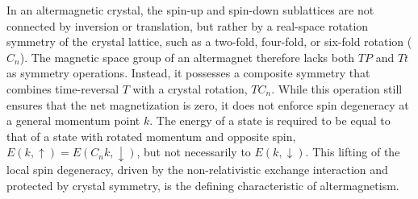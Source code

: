 \documentclass{article}
\begin{document}
In an altermagnetic crystal, the spin-up and spin-down sublattices are not connected by inversion or translation, but rather by a real-space rotation symmetry of the crystal lattice, such as a two-fold, four-fold, or six-fold rotation ($C_n$). The magnetic space group of an altermagnet therefore lacks both 
$TP$ and 
$Tt$ as symmetry operations. Instead, it possesses a composite symmetry that combines time-reversal 
$T$ with a crystal rotation, $ T C_n $. While this operation still ensures that the net magnetization is zero, it does not enforce spin degeneracy at a general momentum point 
$k$. The energy of a state is required to be equal to that of a state with rotated momentum and opposite spin, $E(k,\uparrow)=E(C_n k,\downarrow)$, but not necessarily to $E(k,\downarrow)$. This lifting of the local spin degeneracy, driven by the non-relativistic exchange interaction and protected by crystal symmetry, is the defining characteristic of altermagnetism.
\end{document}
